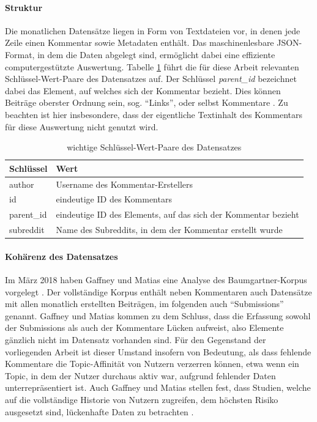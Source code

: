 \documentclass[11pt,a4paper,twoside]{article}
\let\oldpar\paragraph
\renewcommand{\paragraph}{\oldpar*}
\begin{document}
\hypertarget{struktur}{%
\paragraph{Struktur}\label{struktur}}

Die monatlichen Datensätze liegen in Form von Textdateien vor, in denen
jede Zeile einen Kommentar sowie Metadaten enthält. Das maschinenlesbare
JSON-Format, in dem die Daten abgelegt sind, ermöglicht dabei eine
effiziente computergestützte Auswertung. Tabelle \ref{tab:importantkeys}
führt die für diese Arbeit relevanten Schlüssel-Wert-Paare des
Datensatzes auf. Der Schlüssel \emph{parent\_id} bezeichnet dabei das
Element, auf welches sich der Kommentar bezieht. Dies können Beiträge
oberster Ordnung sein, sog. \enquote{Links}, oder selbst Kommentare
\autocite{Reddit2018}. Zu beachten ist hier insbesondere, dass der
eigentliche Textinhalt des Kommentars für diese Auswertung nicht genutzt
wird.

\begin{table}

\caption{\label{tab:importantkeys}wichtige Schlüssel-Wert-Paare des Datensatzes}
\centering
\begin{tabular}[t]{ll}
\toprule
Schlüssel & Wert\\
\midrule
author & Username des Kommentar-Erstellers\\
id & eindeutige ID des Kommentars\\
parent\_id & eindeutige ID des Elements, auf das sich der Kommentar bezieht\\
subreddit & Name des Subreddits, in dem der Kommentar erstellt wurde\\
\bottomrule
\end{tabular}
\end{table}

\hypertarget{koharenz-des-datensatzes}{%
\paragraph{Kohärenz des Datensatzes}\label{koharenz-des-datensatzes}}

Im März 2018 haben Gaffney und Matias eine Analyse des
Baumgartner-Korpus vorgelegt \autocite{Gaffney2018}. Der vollständige
Korpus enthält neben Kommentaren auch Datensätze mit allen monatlich
erstellten Beiträgen, im folgenden auch \enquote{Submissions} genannt.
Gaffney und Matias kommen zu dem Schluss, dass die Erfassung sowohl der
Submissions als auch der Kommentare Lücken aufweist, also Elemente
gänzlich nicht im Datensatz vorhanden sind. Für den Gegenstand der
vorliegenden Arbeit ist dieser Umstand insofern von Bedeutung, als dass
fehlende Kommentare die Topic-Affinität von Nutzern verzerren können,
etwa wenn ein Topic, in dem der Nutzer durchaus aktiv war, aufgrund
fehlender Daten unterrepräsentiert ist. Auch Gaffney und Matias stellen
fest, dass Studien, welche auf die vollständige Historie von Nutzern
zugreifen, dem höchsten Risiko ausgesetzt sind, lückenhafte Daten zu
betrachten \autocite{Gaffney2018}.
\end{document}

